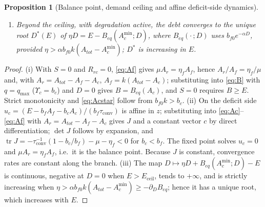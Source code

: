 \documentclass[preprint,12pt,authoryear]{elsarticle}
\newtheorem{proposition}{Proposition}
\newcommand{\Ups}{\Upsilon_c}
\newcommand{\Eceil}{E_{\mathrm{ceil}}}
\newcommand{\Acmin}{A_c^{\min}}
\newcommand{\tconv}{\tau_{\mathrm{conv}}}
\begin{document}
\begin{proposition}[Balance point, demand ceiling and affine deficit-side dynamics]
\begin{enumerate}[label=(\roman*)]
\begin{equation}
\end{equation}
and $\operatorname{tr}J<0$.
$J$ does not depend on $E$ or on the state, $\det J>0$ exactly when $B_{eq}$ is decreasing, and the fixed point of the affine system is the balance point of (i). For $B_{eq}(A_{tot})\le E<\Eceil$ the balance point lies above the typed floor and every trajectory that remains in this regime converges to it at the constant rates given by the eigenvalues of $J$; for $E>\Eceil$ the affine fixed point lies below the floor, so the trajectory approaches the face $A_c=\Acmin$ asymptotically, with a limiting persistent shortfall $S^*=E-\Eceil>0$. The ceiling is a collision of this reduced equilibrium relation with a face of the admissible set, not a bifurcation of its vector field: there is no second branch or fold, no hysteresis of this frozen-demand equilibrium relation, and the leading eigenvalue does not tend to zero as $E\to\Eceil$. These statements apply under the assumptions above; they are not claims that the realized land allocation is independent of its history.
\item Beyond the ceiling, with degradation active, the debt converges to the unique root $D^*(E)$ of $\eta D=E-B_{eq}(\Acmin;D)$, where $B_{eq}(\cdot\,;D)$ uses $b_{f0}e^{-\alpha D}$, provided $\eta>\alpha b_{f0}k(A_{tot}-\Acmin)$; $D^*$ is increasing in $E$.
\end{enumerate}
\end{proposition}

\begin{proof}
(i) With $S=0$ and $R_{rc}=0$, \eqref{eq:Af} gives $\mu A_r=\eta_fA_f$, hence $A_r/A_f=\eta_f/\mu$ and, with $A_r=A_{tot}-A_f-A_c$, $A_f=k(A_{tot}-A_c)$; substituting into \eqref{eq:B} with $q=q_{\max}$ ($\Ups=b_c$) and $D=0$ gives $B=B_{eq}(A_c)$, and $S=0$ requires $B\ge E$. Strict monotonicity and \eqref{eq:Acstar} follow from $b_{f0}k>b_c$. (ii) On the deficit side $u_c=(E-b_fA_f-b_cA_c)/(b_f\tconv)$ is affine in $z$; substituting into \eqref{eq:Ac}--\eqref{eq:Af} with $A_r=A_{tot}-A_f-A_c$ gives $J$ and a constant vector $c$ by direct differentiation; $\det J$ follows by expansion, and $\operatorname{tr}J=-\tconv^{-1}(1-b_c/b_f)-\mu-\eta_f<0$ for $b_c<b_f$. The fixed point solves $u_c=0$ and $\mu A_r=\eta_fA_f$, i.e.\ it is the balance point. Because $J$ is constant, convergence rates are constant along the branch. (iii) The map $D\mapsto\eta D+B_{eq}(\Acmin;D)-E$ is continuous, negative at $D=0$ when $E>\Eceil$, tends to $+\infty$, and is strictly increasing when $\eta>\alpha b_{f0}k(A_{tot}-\Acmin)\ge-\partial_DB_{eq}$; hence it has a unique root, which increases with $E$.
\end{proof}
\end{document}
